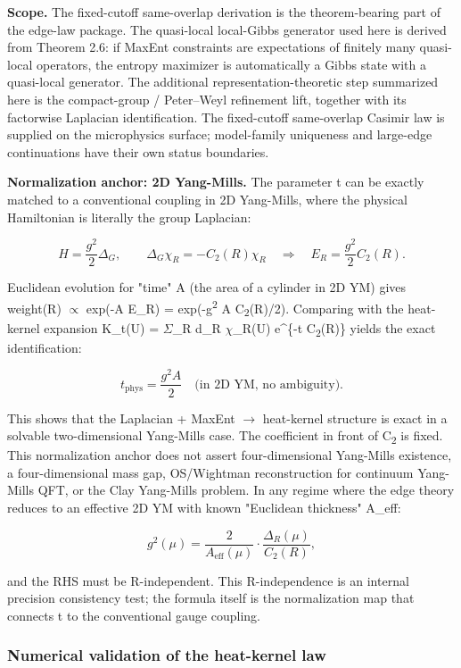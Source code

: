 \textbf{Scope.} The fixed-cutoff same-overlap derivation is the theorem-bearing part of the
edge-law package. The quasi-local local-Gibbs generator used here is derived from Theorem 2.6:
if MaxEnt constraints are expectations of finitely many quasi-local operators, the entropy
maximizer is automatically a Gibbs state with a quasi-local generator. The additional
representation-theoretic step summarized here is the compact-group / Peter--Weyl refinement
lift, together with its factorwise Laplacian identification. The fixed-cutoff same-overlap
Casimir law is supplied on the microphysics surface; model-family uniqueness and large-edge
continuations have their own status boundaries.

\textbf{Normalization anchor: 2D Yang-Mills.} The parameter t can be exactly matched to a conventional coupling in 2D Yang-Mills, where the physical Hamiltonian is literally the group Laplacian:

\[
H = \frac{g^2}{2} \Delta_G, \qquad
\Delta_G \chi_R = -C_2(R) \chi_R
\quad \Rightarrow \quad
E_R = \frac{g^2}{2} C_2(R).
\]

Euclidean evolution for "time" A (the area of a cylinder in 2D YM) gives weight(R) \ensuremath{\propto} exp(-A E\_R) = exp(-g\textsuperscript{2} A C\textsubscript{2}(R)/2). Comparing with the heat-kernel expansion K\_t(U) = \ensuremath{\Sigma}\_R d\_R \ensuremath{\chi}\_R(U) e\^{}\{-t C\textsubscript{2}(R)\} yields the exact identification:

\[
t_\mathrm{phys} = \frac{g^2 A}{2} \quad \text{(in 2D YM, no ambiguity).}
\]

This shows that the Laplacian + MaxEnt \ensuremath{\to} heat-kernel structure is exact in a solvable two-dimensional Yang-Mills case. The coefficient in front of C\textsubscript{2} is fixed. This normalization anchor does not assert four-dimensional Yang-Mills existence, a four-dimensional mass gap, OS/Wightman reconstruction for continuum Yang-Mills QFT, or the Clay Yang-Mills problem. In any regime where the edge theory reduces to an effective 2D YM with known "Euclidean thickness" A\_eff:

\[
g^2(\mu) = \frac{2}{A_\mathrm{eff}(\mu)} \cdot \frac{\Delta_R(\mu)}{C_2(R)},
\]

and the RHS must be R-independent. This R-independence is an internal precision consistency test; the formula itself is the normalization map that connects t to the conventional gauge coupling.

\subsubsection{Numerical validation of the heat-kernel law}\label{614-numerical-validation-of-the-heat-kernel-law}

